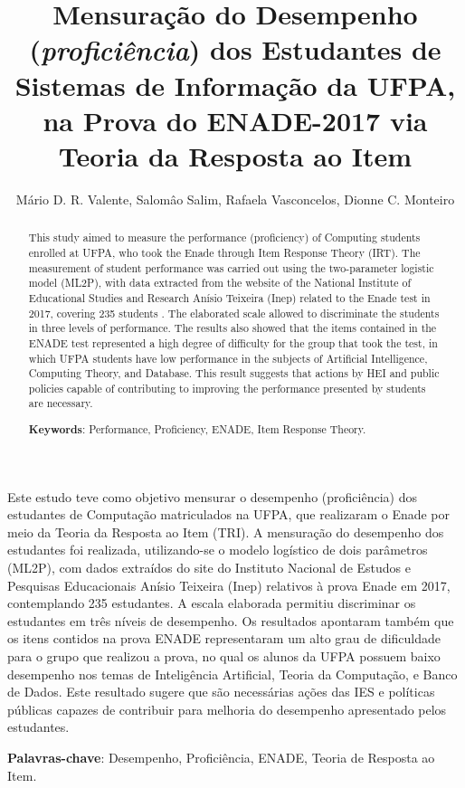\documentclass[12pt]{article}
\title{Mensuração do Desempenho (\textit{proficiência}) dos Estudantes de Sistemas de Informação da UFPA, na Prova do ENADE-2017 via Teoria da Resposta ao Item}
\author{Mário D. R. Valente\inst{1}, Salomâo Salim\inst{1}, Rafaela Vasconcelos\inst{1}, Dionne C. Monteiro\inst{2} }
\begin{document}
 

\maketitle

\begin{abstract}
 This study aimed to measure the performance (proficiency) of Computing students enrolled at UFPA, who took the Enade through Item Response Theory (IRT). The measurement of student performance was carried out using the two-parameter logistic model (ML2P), with data extracted from the website of the National Institute of Educational Studies and Research Anísio Teixeira (Inep) related to the Enade test in 2017, covering 235 students . The elaborated scale allowed to discriminate the students in three levels of performance. The results also showed that the items contained in the ENADE test represented a high degree of difficulty for the group that took the test, in which UFPA students have low performance in the subjects of Artificial Intelligence, Computing Theory, and Database. This result suggests that actions by HEI and public policies capable of contributing to improving the performance presented by students are necessary.
  
\noindent
  \textbf{Keywords}: Performance, Proficiency, ENADE, Item Response Theory.
\end{abstract}

\begin{resumo} 
Este estudo teve como objetivo mensurar o desempenho (proficiência) dos estudantes de Computação matriculados na UFPA, que realizaram o Enade por meio da Teoria da Resposta ao Item (TRI). A mensuração do desempenho dos estudantes foi realizada, utilizando-se o modelo logístico de dois parâmetros (ML2P), com dados extraídos do site do Instituto Nacional de Estudos e Pesquisas Educacionais Anísio Teixeira (Inep) relativos à prova Enade em 2017, contemplando 235 estudantes. A escala elaborada permitiu discriminar os estudantes em três níveis de desempenho. Os resultados apontaram também que os itens contidos na prova ENADE representaram um alto grau de dificuldade para o grupo que realizou a prova, no qual os alunos da UFPA possuem baixo desempenho nos temas de Inteligência Artificial, Teoria da Computação, e Banco de Dados. Este resultado sugere que são necessárias ações das IES e políticas públicas capazes de contribuir para melhoria do desempenho apresentado pelos estudantes.
  
\noindent
  \textbf{Palavras-chave}: Desempenho, Proficiência, ENADE, Teoria de Resposta ao Item.
\end{resumo}
\end{document}
